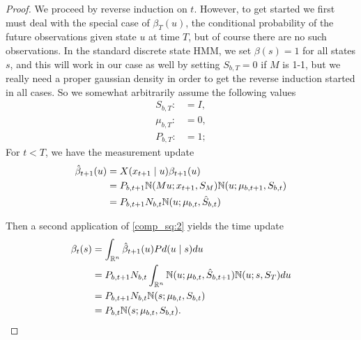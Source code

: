 \documentclass[12pt,leqno]{article}
\begin{document}
\begin{proof}
We proceed by reverse induction on $t$. However, to get started we first must  deal with
the special case of $\beta_{T}(u)$, the conditional probability of the future observations given
state $u$ at time $T$, but of course there are no such observations.  In the standard discrete
state HMM, we set $\beta(s) = 1$ for all states $s$, and this will work in our case as well by
setting $S_{b,T} = 0$ if $M$ is 1-1, but we really need a proper gaussian 
density in order to get the reverse induction started in all cases.  So we somewhat arbitrarily
assume the following values
\begin{align*}
  S_{b,T} :&= I,\\
  \mu_{b,T} :&= 0,\\
  P_{b,T} :&= 1;
\end{align*}
  For $t <  T$, we have the measurement update 
  \begin{align*}
    \hat{\beta}_{t+1}(u) &= X(x_{t+1}\mid u)\beta_{t+1}(u)\\
    &= P_{b,t+1}{\mathbb N}(Mu;x_{t+1},S_M){\mathbb N}(u;\mu_{b,t+1},S_{b,t})\\
    &= P_{b,t+1}N_{b,t}{\mathbb N}(u;\mu_{b,t},\hat{S}_{b,t})
  \end{align*}

  Then a second application of \eqref{comp_sq:2} yields the time update
  \begin{align*}
    \beta_t(s) &= \int_{{\mathbb R}^n}\hat{\beta}_{t+1}(u)Pd(u\mid s)du \\
    &= P_{b,t+1}N_{b,t}\int_{{\mathbb R}^n}{\mathbb N}(u;\mu_{b,t},\hat{S}_{b,t+1}){\mathbb N}(u;s,S_T)du\\
    &=P_{b,t+1}N_{b,t}{\mathbb N}(s;\mu_{b,t},S_{b,t})\\
    &=P_{b,t}{\mathbb N}(s;\mu_{b,t},S_{b,t}).
  \end{align*}
\end{proof}
\end{document}
